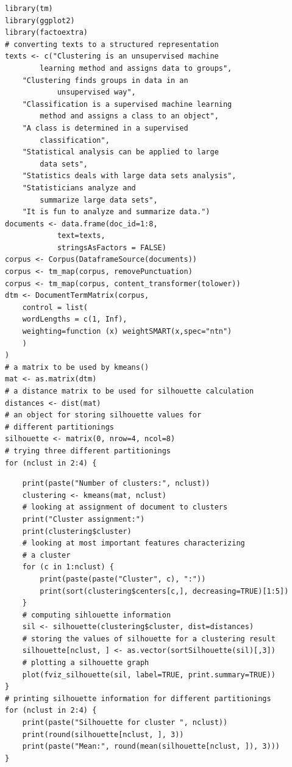 \documentclass[11pt,openany,executivepaper]{book}
\begin{document}
\begin{verbatim}
library(tm)
library(ggplot2)
library(factoextra)
# converting texts to a structured representation
texts <- c("Clustering is an unsupervised machine
        learning method and assigns data to groups",
    "Clustering finds groups in data in an
            unsupervised way",
    "Classification is a supervised machine learning
        method and assigns a class to an object",
    "A class is determined in a supervised
        classification",
    "Statistical analysis can be applied to large
        data sets",
    "Statistics deals with large data sets analysis",
    "Statisticians analyze and
        summarize large data sets",
    "It is fun to analyze and summarize data.")
documents <- data.frame(doc_id=1:8,
            text=texts,
            stringsAsFactors = FALSE)
corpus <- Corpus(DataframeSource(documents))
corpus <- tm_map(corpus, removePunctuation)
corpus <- tm_map(corpus, content_transformer(tolower))
dtm <- DocumentTermMatrix(corpus,
    control = list(
    wordLengths = c(1, Inf),
    weighting=function (x) weightSMART(x,spec="ntn")
    )
)
# a matrix to be used by kmeans()
mat <- as.matrix(dtm)
# a distance matrix to be used for silhouette calculation
distances <- dist(mat)
# an object for storing silhouette values for
# different partitionings
silhouette <- matrix(0, nrow=4, ncol=8)
# trying three different partitionings
for (nclust in 2:4) {
\end{verbatim}

\begin{verbatim}
    print(paste("Number of clusters:", nclust))
    clustering <- kmeans(mat, nclust)
    # looking at assignment of document to clusters
    print("Cluster assignment:")
    print(clustering$cluster)
    # looking at most important features characterizing
    # a cluster
    for (c in 1:nclust) {
        print(paste(paste("Cluster", c), ":"))
        print(sort(clustering$centers[c,], decreasing=TRUE)[1:5])
    }
    # computing sihlouette information
    sil <- silhouette(clustering$cluster, dist=distances)
    # storing the values of silhouette for a clustering result
    silhouette[nclust, ] <- as.vector(sortSilhouette(sil)[,3])
    # plotting a silhouette graph
    plot(fviz_silhouette(sil, label=TRUE, print.summary=TRUE))
}
# printing silhouette information for different partitionings
for (nclust in 2:4) {
    print(paste("Silhouette for cluster ", nclust))
    print(round(silhouette[nclust, ], 3))
    print(paste("Mean:", round(mean(silhouette[nclust, ]), 3)))
}
\end{verbatim}
\end{document}
